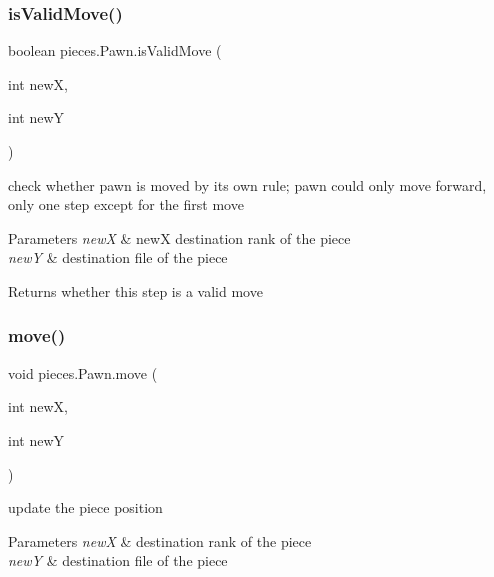 \subsubsection{\texorpdfstring{is\+Valid\+Move()}{isValidMove()}}
{\footnotesize\ttfamily boolean pieces.\+Pawn.\+is\+Valid\+Move (\begin{DoxyParamCaption}\item[{int}]{newX,  }\item[{int}]{newY }\end{DoxyParamCaption})\hspace{0.3cm}{\ttfamily [inline]}}

check whether pawn is moved by its own rule; pawn could only move forward, only one step except for the first move 
\begin{DoxyParams}{Parameters}
{\em newX} & newX destination rank of the piece \\
\hline
{\em newY} & destination file of the piece \\
\hline
\end{DoxyParams}
\begin{DoxyReturn}{Returns}
whether this step is a valid move 
\end{DoxyReturn}
\mbox{\label{classpieces_1_1_pawn_ae20b1ede53cd4d2f6c1c064d05efaf93}} 
\subsubsection{\texorpdfstring{move()}{move()}}
{\footnotesize\ttfamily void pieces.\+Pawn.\+move (\begin{DoxyParamCaption}\item[{int}]{newX,  }\item[{int}]{newY }\end{DoxyParamCaption})\hspace{0.3cm}{\ttfamily [inline]}}

update the piece position 
\begin{DoxyParams}{Parameters}
{\em newX} & destination rank of the piece \\
\hline
{\em newY} & destination file of the piece \\
\hline
\end{DoxyParams}
\mbox{\label{classpieces_1_1_pawn_a2d97ee355c63d23a5ff0117ddf2a85b9}} 

